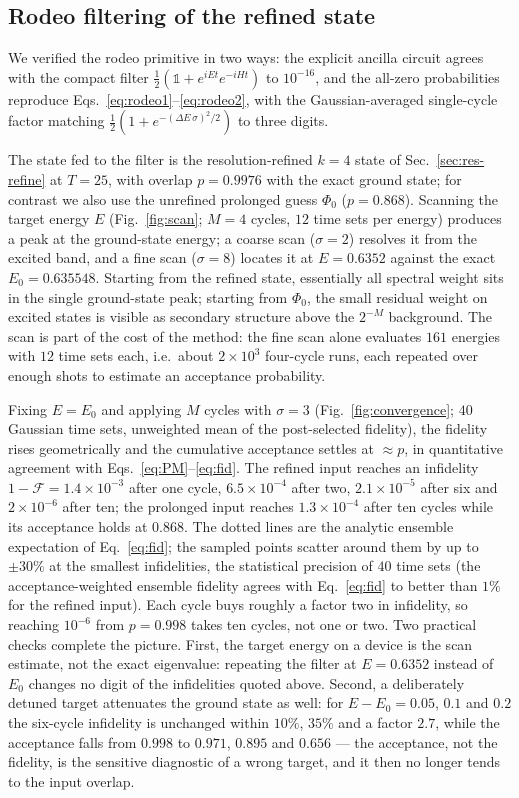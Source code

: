\documentclass[
  aps,            %
  prc,            %
  reprint,        %
  superscriptaddress,
  floatfix,
  nofootinbib
]{revtex4-2}
\begin{document}
\subsection{Rodeo filtering of the refined state}
\label{sec:res-rodeo}
We verified the rodeo primitive in two ways: the explicit ancilla circuit agrees with
the compact filter $\tfrac12(\mathbb{1}+e^{iEt}e^{-iHt})$ to $10^{-16}$, and the
all-zero probabilities reproduce Eqs.~\eqref{eq:rodeo1}--\eqref{eq:rodeo2}, with the
Gaussian-averaged single-cycle factor matching $\tfrac12(1+e^{-(\Delta E\,\sigma)^2/2})$
to three digits.

The state fed to the filter is the resolution-refined $k=4$ state of
Sec.~\ref{sec:res-refine} at $T=25$, with overlap $p=0.9976$ with the exact ground
state; for contrast we also use the unrefined prolonged guess $\Phi_0$ ($p=0.868$).
Scanning the target energy $E$ (Fig.~\ref{fig:scan}; $M=4$ cycles, $12$ time sets
per energy) produces a peak at the ground-state energy; a coarse scan
($\sigma=2$) resolves it from the excited band, and a fine scan ($\sigma=8$)
locates it at $E=0.6352$ against the exact $E_0=0.635548$.  Starting from the
refined state, essentially all spectral weight sits in the single ground-state
peak; starting from $\Phi_0$, the small residual weight on excited states is
visible as secondary structure above the $2^{-M}$ background.  The scan is part
of the cost of the method: the fine scan alone evaluates $161$ energies with
$12$ time sets each, i.e.\ about $2\times10^{3}$ four-cycle runs, each repeated
over enough shots to estimate an acceptance probability.

Fixing $E=E_0$ and applying $M$ cycles with $\sigma=3$
(Fig.~\ref{fig:convergence}; $40$ Gaussian time sets, unweighted mean of the
post-selected fidelity), the fidelity rises geometrically and the cumulative
acceptance settles at $\approx p$, in quantitative agreement with
Eqs.~\eqref{eq:PM}--\eqref{eq:fid}.  The refined input reaches an infidelity
$1-\mathcal{F}=1.4\times10^{-3}$ after one cycle, $6.5\times10^{-4}$ after two,
$2.1\times10^{-5}$ after six and $2\times10^{-6}$ after ten; the prolonged input
reaches $1.3\times10^{-4}$ after ten cycles while its acceptance holds at
$0.868$.  The dotted lines are the analytic ensemble expectation of
Eq.~\eqref{eq:fid}; the sampled points scatter around them by up to $\pm30\%$
at the smallest infidelities, the statistical precision of $40$ time sets
(the acceptance-weighted ensemble fidelity agrees with Eq.~\eqref{eq:fid} to
better than $1\%$ for the refined input).  Each cycle buys roughly a factor two
in infidelity, so reaching $10^{-6}$ from $p=0.998$ takes ten cycles, not one
or two.  Two practical checks complete the picture.  First, the target energy
on a device is the scan estimate, not the exact eigenvalue: repeating the
filter at $E=0.6352$ instead of $E_0$ changes no digit of the infidelities
quoted above.  Second, a deliberately detuned target attenuates the ground
state as well: for $E-E_0=0.05$, $0.1$ and $0.2$ the six-cycle infidelity is
unchanged within $10\%$, $35\%$ and a factor $2.7$, while the acceptance falls
from $0.998$ to $0.971$, $0.895$ and $0.656$ --- the acceptance, not the
fidelity, is the sensitive diagnostic of a wrong target, and it then no longer
tends to the input overlap.
\end{document}
